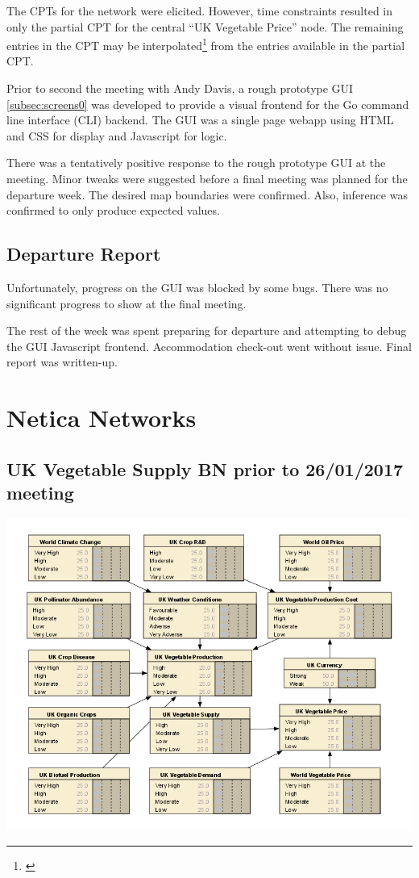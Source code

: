 \documentclass[12pt,notitlepage]{article}
\begin{document}
\begin{multicols*}{2}
The CPTs for the network were elicited. However, time constraints resulted in only the partial CPT for the central ``UK Vegetable Price'' node. The remaining entries in the CPT may be interpolated\footnote{\cite{cain2001}} from the entries available in the partial CPT.

Prior to second the meeting with Andy Davis, a rough prototype GUI \ref{subsec:screens0} was developed to provide a visual frontend for the Go command line interface (CLI) backend. The GUI was a single page webapp using HTML and CSS for display and Javascript for logic.

There was a tentatively positive response to the rough prototype GUI at the meeting. Minor tweaks were suggested before a final meeting was planned for the departure week. The desired map boundaries were confirmed. Also, inference was confirmed to only produce expected values.
\subsection{Departure Report}\label{subsec:departure}
Unfortunately, progress on the GUI was blocked by some bugs. There was no significant progress to show at the final meeting.

The rest of the week was spent preparing for departure and attempting to debug the GUI Javascript frontend. Accommodation check-out went without issue. Final report was written-up.
\end{multicols*}

\clearpage
\section{Netica Networks}\label{sec:networks}
\subsection{UK Vegetable Supply BN prior to 26/01/2017 meeting}\label{subsec:network0}
\begin{center}
\includegraphics[width=\linewidth]{network0}
\end{center}
\end{document}

